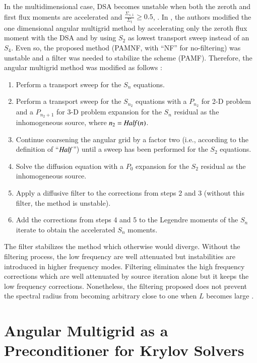 \documentclass[preprint,10pt]{elsarticle}
\renewcommand{\(}{\left(}
\renewcommand{\)}{\right)}
\renewcommand{\[}{\left[}
\renewcommand{\]}{\right]}
\newcommand{\Half}{\text{\it Half\,}}
\begin{document}
In the multidimensional case, DSA becomes unstable when both the zeroth 
and first flux moments are accelerated and $\frac{\Sigma_{s,1}}{\Sigma_t}
\geq 0.5$, \cite{multisweep}. In \cite{multigrid_2d}, the authors modified the
one dimensional angular multigrid method by accelerating only the zeroth flux
moment with the DSA and by using $S_2$ as lowest transport sweep
instead of an $S_4$. Even so, the proposed method (PAMNF, with ``NF'' for no-filtering) 
was unstable and a filter was needed to stabilize the scheme (PAMF). Therefore, the angular 
multigrid method was modified as follows \cite{multigrid_2d} :
%
\begin{enumerate}
\item Perform a transport sweep for the $S_n$ equations.
\item Perform a transport sweep for the $S_{n_2}$ equations with a $P_{n_2}$
for 2-D problem and a $P_{n_2+1}$ for 3-D problem expansion for the $S_n$
residual as the inhomogeneous source, where $n_2=\Half(n)$.
\item Continue coarsening the angular grid by a factor two (i.e., according to the
definition of ``$\Half$'') until a sweep has been performed for the $S_2$
equations.
\item Solve the diffusion equation with a $P_0$ expansion for the $S_2$
residual as the inhomogeneous source. 
\item Apply a diffusive filter to the corrections from steps 2 and 3 (without
this filter, the method is unstable).
\item Add the corrections from steps 4 and 5 to the Legendre moments of the
$S_n$ iterate to obtain the accelerated $S_n$ moments.
\end{enumerate}
%
The filter stabilizes the method which otherwise would diverge. Without the
filtering process, the low frequency are well attenuated but instabilities are introduced
in higher frequency modes. Filtering eliminates the high frequency
corrections which are well attenuated by source iteration alone but it keeps
the low frequency corrections. Nonetheless, the filtering proposed does not prevent
the spectral radius from becoming arbitrary close to one 
when $L$ becomes large \cite{multigrid_2d}.


\section{Angular Multigrid as a Preconditioner for Krylov Solvers} \label{sec:preconditioner}
\end{document}
